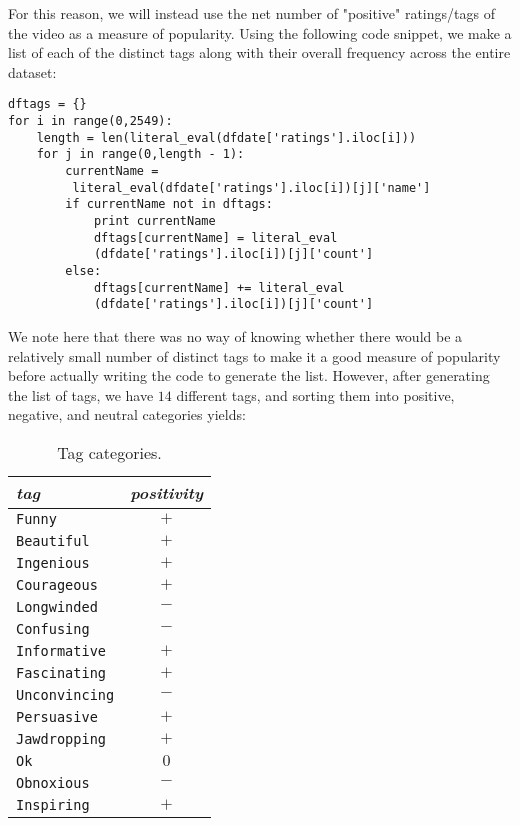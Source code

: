 \documentclass[11pt,oneside,reqno]{amsart}
\theoremstyle{plain}
\theoremstyle{definition}
\theoremstyle{remark}
\newcommand{\inlinecode}{\texttt}
\newcommand{\ra}[1]{\renewcommand{\arraystretch}{#1}}
\begin{document}
For this reason, we will instead use the net number of "positive" ratings/tags of the video as a measure of popularity. Using the following code snippet, we make a list of each of the distinct tags along with their overall frequency across the entire dataset:

\begin{framed}
\begin{verbatim}
dftags = {}
for i in range(0,2549):
    length = len(literal_eval(dfdate['ratings'].iloc[i]))
    for j in range(0,length - 1):
        currentName =
         literal_eval(dfdate['ratings'].iloc[i])[j]['name']
        if currentName not in dftags:
            print currentName
            dftags[currentName] = literal_eval
            (dfdate['ratings'].iloc[i])[j]['count']
        else:
            dftags[currentName] += literal_eval
            (dfdate['ratings'].iloc[i])[j]['count']
\end{verbatim}
\end{framed}

 We note here that there was no way of knowing whether there would be a relatively small number of distinct tags to make it a good measure of popularity before actually writing the code to generate the list. However, after generating the list of tags, we have $14$ different tags, and sorting them into positive, negative, and neutral categories yields:
 
 \begin{table}[H]\label{table3}\centering
\ra{1.2}
\begin{tabular}{@{}lc@{}}\toprule[1.7pt]
\textit{tag}
& \textit{positivity}\\
\midrule
\inlinecode{Funny} & $+$\\
\inlinecode{Beautiful} & $+$\\
\inlinecode{Ingenious} & $+$\\
\inlinecode{Courageous} & $+$\\
\inlinecode{Longwinded} & $-$\\
\inlinecode{Confusing} & $-$\\
\inlinecode{Informative} & $+$\\
\inlinecode{Fascinating} & $+$\\
\inlinecode{Unconvincing} & $-$\\
\inlinecode{Persuasive} & $+$\\
\inlinecode{Jawdropping} & $+$\\
\inlinecode{Ok} & $0$\\
\inlinecode{Obnoxious} & $-$\\
\inlinecode{Inspiring} & $+$\\
\bottomrule[1.7pt]
\end{tabular}
\vspace{1mm}
\caption{Tag categories. } 
\end{table}
\end{document}
